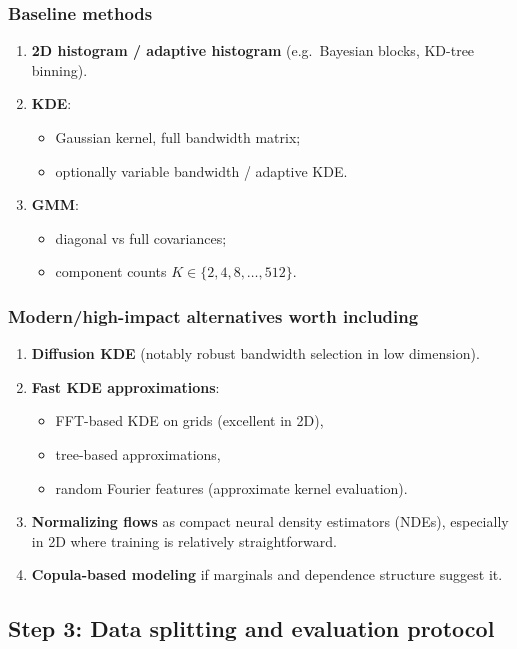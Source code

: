 \documentclass[twocolumn]{notes}
\begin{document}
\subsubsection{Baseline methods}
\begin{enumerate}[leftmargin=2em]
\item \textbf{2D histogram / adaptive histogram} (e.g.\ Bayesian blocks, KD-tree binning).
\item \textbf{KDE}:
  \begin{itemize}
  \item Gaussian kernel, full bandwidth matrix;
  \item optionally variable bandwidth / adaptive KDE.
  \end{itemize}
\item \textbf{GMM}:
  \begin{itemize}
  \item diagonal vs full covariances;
  \item component counts $K\in\{2,4,8,\dots,512\}$.
  \end{itemize}
\end{enumerate}

\subsubsection{Modern/high-impact alternatives worth including}
\begin{enumerate}[leftmargin=2em]
\item \textbf{Diffusion KDE} (notably robust bandwidth selection in low dimension).
\item \textbf{Fast KDE approximations}:
  \begin{itemize}
  \item FFT-based KDE on grids (excellent in 2D),
  \item tree-based approximations,
  \item random Fourier features (approximate kernel evaluation).
  \end{itemize}
\item \textbf{Normalizing flows} as compact neural density estimators (NDEs), especially in 2D where training is relatively straightforward.
\item \textbf{Copula-based modeling} if marginals and dependence structure suggest it.
\end{enumerate}

\subsection{Step 3: Data splitting and evaluation protocol}
\end{document}
